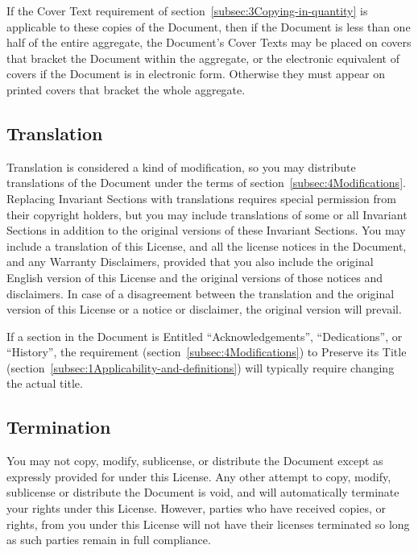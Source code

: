 {\tiny{}If the Cover Text requirement of section~\ref{subsec:3Copying-in-quantity}
is applicable to these copies of the Document, then if the Document
is less than one half of the entire aggregate, the Document\textsf{'}s Cover
Texts may be placed on covers that bracket the Document within the
aggregate, or the electronic equivalent of covers if the Document
is in electronic form. Otherwise they must appear on printed covers
that bracket the whole aggregate.}{\tiny\par}

\subsection*{{\tiny{}Translation}}

{\tiny{}Translation is considered a kind of modification, so you may
distribute translations of the Document under the terms of section~\ref{subsec:4Modifications}.
Replacing Invariant Sections with translations requires special permission
from their copyright holders, but you may include translations of
some or all Invariant Sections in addition to the original versions
of these Invariant Sections. You may include a translation of this
License, and all the license notices in the Document, and any Warranty
Disclaimers, provided that you also include the original English version
of this License and the original versions of those notices and disclaimers.
In case of a disagreement between the translation and the original
version of this License or a notice or disclaimer, the original version
will prevail.}{\tiny\par}

{\tiny{}If a section in the Document is Entitled \textquotedblleft Acknowledgements\textquotedblright ,
\textquotedblleft Dedications\textquotedblright , or \textquotedblleft History\textquotedblright ,
the requirement (section~\ref{subsec:4Modifications}) to Preserve
its Title (section~\ref{subsec:1Applicability-and-definitions})
will typically require changing the actual title.}{\tiny\par}

\subsection*{{\tiny{}Termination}}

{\tiny{}You may not copy, modify, sublicense, or distribute the Document
except as expressly provided for under this License. Any other attempt
to copy, modify, sublicense or distribute the Document is void, and
will automatically terminate your rights under this License. However,
parties who have received copies, or rights, from you under this License
will not have their licenses terminated so long as such parties remain
in full compliance.}{\tiny\par}

